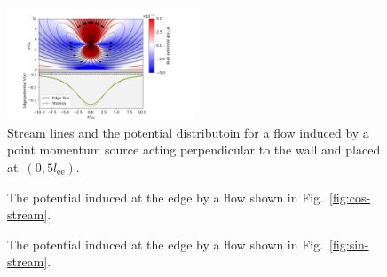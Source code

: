 \documentclass[preprint,aps,eqsecnum, prb]{revtex4-1}
\begin{document}
\begin{figure}
  \def\svgwidth{0.5\textwidth}
  \includegraphics[width=0.5\textwidth, trim=0in 0in 0in 0in]{combined-sin-h=5.png}
  \caption{
    \label{fig:sin-stream-large}
    \label{fig:sin-rho-large}
    Stream lines and the potential distributoin
    for a flow induced by a point momentum source
    acting perpendicular to the wall and placed at~$(0, 5l_\mathrm{ee})$.
  }
\end{figure}

\begin{figure}
  \def\svgwidth{0.5\textwidth}
  
  \caption{
    \label{fig:cos-flux}
    The potential induced at the edge by a flow shown in Fig.~\ref{fig:cos-stream}.
  }
\end{figure}
\begin{figure}
  \def\svgwidth{0.5\textwidth}
  
  \caption{
    \label{fig:sin-flux}
    The potential induced at the edge by a flow shown in Fig.~\ref{fig:sin-stream}.
  }
\end{figure}
\end{document}
